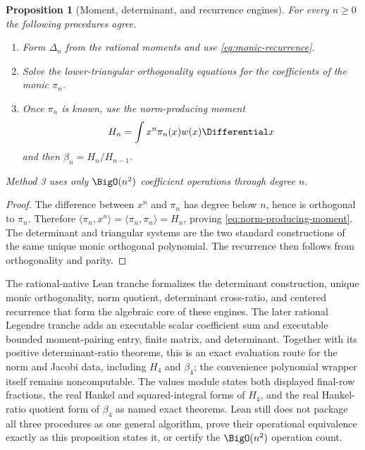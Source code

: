 \documentclass[11pt,oneside]{article}
\newtheorem{proposition}[theorem]{Proposition}
\theoremstyle{definition}
\theoremstyle{remark}
\numberwithin{equation}{section}
\begin{document}
\begin{proposition}[Moment, determinant, and recurrence engines]
\label{prop:three-engines}
For every $n\ge0$ the following procedures agree.
\begin{enumerate}
\item Form $\Delta_n$ from the rational moments and use
      \cref{eq:monic-recurrence}.
\item Solve the lower-triangular orthogonality equations for the coefficients
      of the monic $\pi_n$.
\item Once $\pi_n$ is known, use the norm-producing moment
      \begin{equation}
       H_n=\int x^n\pi_n(x)w(x)\Differential x
       \label{eq:norm-producing-moment}
      \end{equation}
      and then $\beta_n=H_n/H_{n-1}$.
\end{enumerate}
Method 3 uses only $\BigO(n^2)$ coefficient operations through degree $n$.
\end{proposition}

\begin{proof}
The difference between $x^n$ and $\pi_n$ has degree below $n$, hence is
orthogonal to $\pi_n$.  Therefore
$\langle\pi_n,x^n\rangle=\langle\pi_n,\pi_n\rangle=H_n$, proving
\cref{eq:norm-producing-moment}.  The determinant and triangular systems are
the two standard constructions of the same unique monic orthogonal
polynomial.  The recurrence then follows from orthogonality and parity.
\end{proof}

The rational-native Lean tranche formalizes the determinant construction,
unique monic orthogonality, norm quotient, determinant cross-ratio, and centered
recurrence that form the algebraic core of these engines.  The later rational
Legendre tranche adds an executable scalar coefficient sum and executable bounded
moment-pairing entry, finite matrix, and determinant.  Together with its positive
determinant-ratio theorems, this is an exact evaluation route for the norm and
Jacobi data, including \(H_4\) and \(\beta_4\); the convenience polynomial wrapper
itself remains noncomputable.  The values module states both displayed final-row
fractions, the real Hankel and squared-integral forms of \(H_4\), and the real
Hankel-ratio quotient form of \(\beta_4\) as named exact theorems.  Lean still does not
package all three procedures as one general algorithm, prove their operational
equivalence exactly as this proposition states it, or certify the
\(\BigO(n^2)\) operation count.
\end{document}

